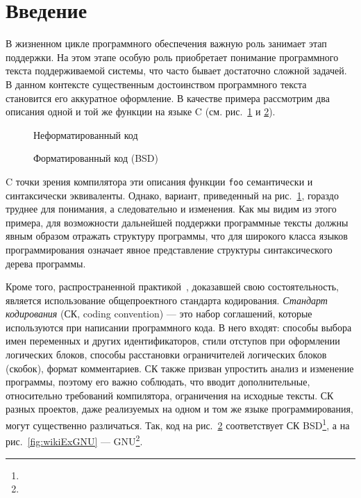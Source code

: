 \section*{Введение}

В жизненном цикле программного обеспечения важную роль занимает этап
поддержки\cite{maintance}. На этом этапе особую роль приобретает
понимание программного текста поддерживаемой системы, что часто бывает
достаточно сложной задачей. В данном контексте существенным достоинством
программного текста становится его аккуратное оформление.
В качестве примера рассмотрим два описания одной и той же функции на языке C
(см. рис.~\ref{fig:wikiExUnfor} и \ref{fig:wikiExBSD}).

\begin{figure}[h!]
	\centering
	
	\caption{Неформатированный код}
	\label{fig:wikiExUnfor}
\end{figure}

\begin{figure}[h!]
	\centering
	
  \caption{Форматированный код (BSD)}
	\label{fig:wikiExBSD}
\end{figure}

C точки зрения компилятора
эти описания функции \lstinline[language = Java]{foo}
семантически и синтаксически эквиваленты.
Однако, вариант, приведенный на
рис.~\ref{fig:wikiExUnfor}, гораздо труднее для
понимания, а следовательно и изменения.
Как мы видим из этого примера, для возможности дальнейшей поддержки
программные тексты должны явным образом
отражать структуру программы, что для широкого класса языков
программирования означает явное представление структуры синтаксического
дерева программы.

Кроме того, распространенной практикой~\cite{codingStandarts},
доказавшей свою состоятельность, является использование
общепроектного стандарта кодирования.
\emph{Стандарт кодирования} (СК, coding convention) ---
это набор соглашений, которые используются
при написании программного кода. В него входят: способы выбора имен переменных
и других идентификаторов, стили отступов при оформлении логических блоков,
способы расстановки ограничителей логических блоков (скобок),
формат комментариев. СК также призван упростить анализ и изменение
программы, поэтому его важно соблюдать, что вводит
дополнительные, относительно требований компилятора,
ограничения на исходные тексты. СК разных проектов, даже
реализуемых на одном и том же языке программирования, могут существенно
различаться.
Так, код на рис.~\ref{fig:wikiExBSD} соответствует СК
BSD\footnote{},
а на рис.~\ref{fig:wikiExGNU} ---
GNU\footnote{}.

